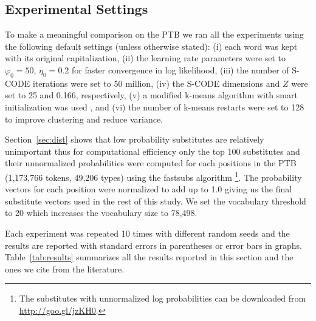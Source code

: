 \subsection{Experimental Settings}\label{sec:expset}

To make a meaningful comparison on the PTB we ran all the experiments
using the following default settings (unless otherwise stated): (i)
each word was kept with its original capitalization, (ii) the learning
rate parameters were set to $\varphi_0=50$, $\eta_0=0.2$ for faster
convergence in log likelihood, (iii) the number of S-CODE iterations
were set to 50 million, (iv) the S-CODE dimensions and $Z$ were set to
25 and 0.166, respectively, (v) a modified k-means algorithm with
smart initialization was used \cite{arthur2007k}, and (vi) the number
of k-means restarts were set to 128 to improve clustering and reduce
variance.

Section~\ref{sec:dist} shows that low probability substitutes are
relatively unimportant thus for computational efficiency only the top
100 substitutes and their unnormalized probabilities were computed for
each positions in the PTB (1,173,766 tokens, 49,206 types) using the
{\sc fastsubs} algorithm \cite{yuret2012fastsub}\footnote{The
  substitutes with unnormalized log probabilities can be downloaded
  from \mbox{\url{http://goo.gl/jzKH0}}.}.  The probability vectors
for each position were normalized to add up to 1.0 giving us the final
substitute vectors used in the rest of this study.  We set the
vocabulary threshold to 20 which increases the vocabulary size to
78,498.



Each experiment was repeated 10 times with different random seeds and
the results are reported with standard errors in parentheses or error
bars in graphs.  Table~\ref{tab:results} summarizes all the results
reported in this section and the ones we cite from the literature.

